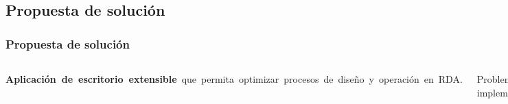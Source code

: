\documentclass[9pt]{beamer}
\begin{document}
    \subsection{Propuesta de solución}
    \begin{frame}
        \frametitle{Propuesta de solución}
        
        \begin{columns}
            \textbf{Aplicación de escritorio extensible} que permita optimizar procesos de diseño y operación en RDA.\bigskip
    
            Problemas implementados:
            \bigskip
            \begin{itemize}  
                \justifying
                \item Problema de diseño de RDA basado en el costo de tuberías.
                \item Problema de operación basado en el Régimen de bombeo.
            \end{itemize}

            \begin{figure}
                \includegraphics[width=\textwidth]{assets/Interfaces/Principal_Propuesta.png}
            \end{figure}
        \end{columns}

    \end{frame}
\end{document}
